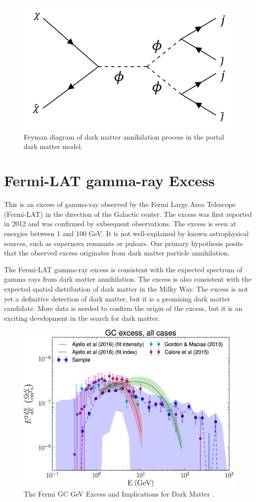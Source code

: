 \documentclass[10pt, oneside]{book}
\numberwithin{equation}{chapter}
\begin{document}
\begin{figure}
    \centering
    \includegraphics[width=0.5\linewidth]{images/feynman.png}
    \caption{Feyman diagram of dark matter annihilation process in the portal dark matter model.}
    \label{fig:enter-label}
\end{figure}
\section{Fermi-LAT gamma-ray Excess}
This is an excess of gamma-ray observed by the Fermi Large Area Telescope (Fermi-LAT) in the direction of the Galactic center. The excess was first reported in 2012 and was confirmed by subsequent observations. The excess is seen at energies between 1 and 100 GeV. It is not well-explained by known astrophysical sources, such as supernova remnants or pulsars. Our primary hypothesis posits that the observed excess originates from dark matter particle annihilation.

The Fermi-LAT gamma-ray excess is consistent with the expected spectrum of gamma rays from dark matter annihilation. The excess is also consistent with the expected spatial distribution of dark matter in the Milky Way. The excess is not yet a definitive detection of dark matter, but it is a promising dark matter candidate. More data is needed to confirm the origin of the excess, but it is an exciting development in the search for dark matter.

\begin{figure}[h]
	\centering
	\includegraphics[width=0.7\linewidth]{images/Fermi-LAT}
	\caption{The Fermi GC GeV Excess and Implications for Dark Matter \cite{Ackermann_2017}.}
	\label{fig:fermi-lat}
\end{figure}
\end{document}
